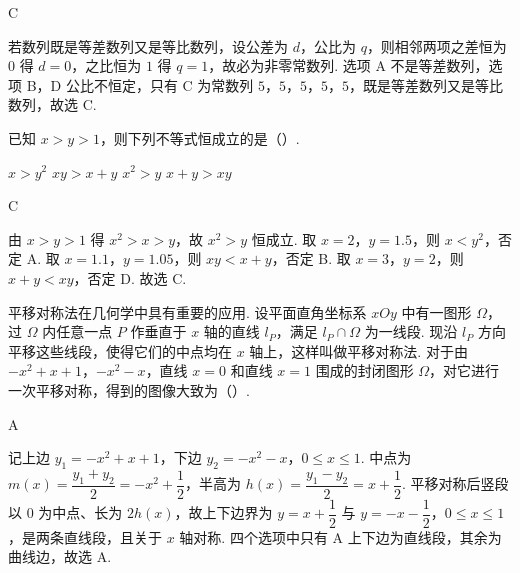 \begin{answer}
C
\end{answer}

\begin{solution}
若数列既是等差数列又是等比数列，设公差为 \(d\)，公比为 \(q\)，则相邻两项之差恒为 \(0\) 得 \(d=0\)，之比恒为 \(1\) 得 \(q=1\)，故必为非零常数列. 选项 A 不是等差数列，选项 B，D 公比不恒定，只有 C 为常数列 \(5\)，\(5\)，\(5\)，\(5\)，\(5\)，既是等差数列又是等比数列，故选 C.
\end{solution}

\begin{problem}
已知 \(x>y>1\)，则下列不等式恒成立的是（\quad）.

\choices
    {\(x>y^2\)}
    {\(xy>x+y\)}
    {\(x^2>y\)}
    {\(x+y>xy\)}
\end{problem}

\begin{answer}
C
\end{answer}

\begin{solution}
由 \(x>y>1\) 得 \(x^2>x>y\)，故 \(x^2>y\) 恒成立. 取 \(x=2\)，\(y=1.5\)，则 \(x<y^2\)，否定 A. 取 \(x=1.1\)，\(y=1.05\)，则 \(xy<x+y\)，否定 B. 取 \(x=3\)，\(y=2\)，则 \(x+y<xy\)，否定 D. 故选 C.
\end{solution}

\begin{problem}
平移对称法在几何学中具有重要的应用. 设平面直角坐标系 \(xOy\) 中有一图形 \(\Omega\)，过 \(\Omega\) 内任意一点 \(P\) 作垂直于 \(x\) 轴的直线 \(l_P\)，满足 \(l_P\cap\Omega\) 为一线段. 现沿 \(l_P\) 方向平移这些线段，使得它们的中点均在 \(x\) 轴上，这样叫做平移对称法. 对于由 \(-x^2+x+1\)，\(-x^2-x\)，直线 \(x=0\) 和直线 \(x=1\) 围成的封闭图形 \(\Omega\)，对它进行一次平移对称，得到的图像大致为（\quad）.

    {}
    {}
    {}
\end{problem}

\begin{answer}
A
\end{answer}

\begin{solution}
记上边 \(y_1=-x^2+x+1\)，下边 \(y_2=-x^2-x\)，\(0\le x\le1\). 中点为 \(m(x)=\dfrac{y_1+y_2}{2}=-x^2+\dfrac12\)，半高为 \(h(x)=\dfrac{y_1-y_2}{2}=x+\dfrac12\). 平移对称后竖段以 \(0\) 为中点、长为 \(2h(x)\)，故上下边界为 \(y=x+\dfrac12\) 与 \(y=-x-\dfrac12\)，\(0\le x\le1\)，是两条直线段，且关于 \(x\) 轴对称. 四个选项中只有 A 上下边为直线段，其余为曲线边，故选 A.
\end{solution}

